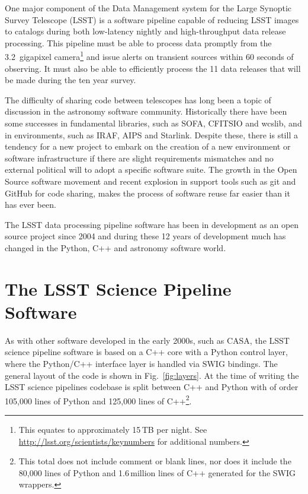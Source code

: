 \documentclass[]{spie}  %
\begin{document}
One major component of the Data Management system\cite{2016_adassxxv_O3-1} for the Large Synoptic Survey Telescope (LSST)\cite{2008arXiv0805.2366I,2016SPIE-Kahn,2014SPIE.9145E..1AG} is a software pipeline capable of reducing LSST images to catalogs during both low-latency nightly and high-throughput data release processing.
This pipeline must be able to process data promptly from the 3.2~gigapixel camera\footnote{This equates to approximately 15\,TB per night. See \url{http://lsst.org/scientists/keynumbers} for additional numbers.} and issue alerts on transient sources within 60 seconds of observing.
It must also be able to efficiently process the 11 data releases that will be made during the ten year survey.

The difficulty of sharing code between telescopes has long been a topic of discussion in the astronomy software community\cite{1998ASPC..145..142M,1999ASPC..172...11E,2001ASSL..266..163S,2002SPIE.4844..321E}.
Historically there have been some successes in fundamental libraries, such as SOFA\cite{2011SchpJ...611404H}, CFITSIO\cite{1999ASPC..172..487P} and wcslib\cite{2011ascl.soft08003C}, and in environments, such as IRAF\cite{1986SPIE..627..733T}, AIPS\cite{1996ASPC..101...37V} and Starlink\cite{1982QJRAS..23..485D}.
Despite these, there is still a tendency for a new project to embark on the creation of a new environment or software infrastructure if there are slight requirements mismatches and no external political will to adopt a specific software suite.
The growth in the Open Source software movement\cite{2006OpenSources} and recent explosion in support tools such as git and GitHub for code sharing\cite{2014IACWSLima}, makes the process of software reuse far easier than it has ever been.

The LSST data processing pipeline software has been in development as an open source project since 2004\cite{2004AAS...20510811A,2010SPIE.7740E..15A,2016_adassxxv_P056} and during these 12 years of development much has changed in the Python, C++ and astronomy software world.


\section{The LSST Science Pipeline Software}

As with other software developed in the early 2000s, such as CASA\cite{2012ASPC..461..849P}, the LSST science pipeline software is based on a C++ core with a Python control layer, where the Python/C++ interface layer is handled via SWIG\cite{beazley2003automated} bindings.
The general layout of the code is shown in Fig.~\ref{fig:layers}.
At the time of writing the LSST science pipelines codebase is split between C++ and Python with of order 105,000 lines of Python and 125,000 lines of C++\footnote{This total does not include comment or blank lines, nor does it include the 80,000 lines of Python and 1.6\,million lines of C++ generated for the SWIG wrappers.}.
\end{document}
